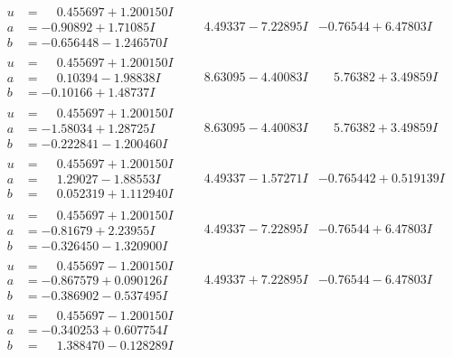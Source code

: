 \documentclass[1p]{elsarticle_modified}
\theoremstyle{definition}
\begin{document}
$$\begin{array}{c|c|c}
\begin{aligned}
u &= \phantom{-}0.455697 + 1.200150 I \\
a &= -0.90892 + 1.71085 I \\
b &= -0.656448 - 1.246570 I\end{aligned}
 & \phantom{-}4.49337 - 7.22895 I & -0.76544 + 6.47803 I \\ \hline\begin{aligned}
u &= \phantom{-}0.455697 + 1.200150 I \\
a &= \phantom{-}0.10394 - 1.98838 I \\
b &= -0.10166 + 1.48737 I\end{aligned}
 & \phantom{-}8.63095 - 4.40083 I & \phantom{-}5.76382 + 3.49859 I \\ \hline\begin{aligned}
u &= \phantom{-}0.455697 + 1.200150 I \\
a &= -1.58034 + 1.28725 I \\
b &= -0.222841 - 1.200460 I\end{aligned}
 & \phantom{-}8.63095 - 4.40083 I & \phantom{-}5.76382 + 3.49859 I \\ \hline\begin{aligned}
u &= \phantom{-}0.455697 + 1.200150 I \\
a &= \phantom{-}1.29027 - 1.88553 I \\
b &= \phantom{-}0.052319 + 1.112940 I\end{aligned}
 & \phantom{-}4.49337 - 1.57271 I & -0.765442 + 0.519139 I \\ \hline\begin{aligned}
u &= \phantom{-}0.455697 + 1.200150 I \\
a &= -0.81679 + 2.23955 I \\
b &= -0.326450 - 1.320900 I\end{aligned}
 & \phantom{-}4.49337 - 7.22895 I & -0.76544 + 6.47803 I \\ \hline\begin{aligned}
u &= \phantom{-}0.455697 - 1.200150 I \\
a &= -0.867579 + 0.090126 I \\
b &= -0.386902 - 0.537495 I\end{aligned}
 & \phantom{-}4.49337 + 7.22895 I & -0.76544 - 6.47803 I \\ \hline\begin{aligned}
u &= \phantom{-}0.455697 - 1.200150 I \\
a &= -0.340253 + 0.607754 I \\
b &= \phantom{-}1.388470 - 0.128289 I\end{aligned}

\end{array}$$
\end{document}
